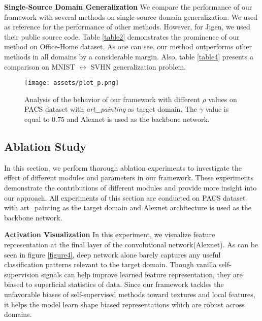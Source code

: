 \documentclass[10pt,twocolumn,letterpaper]{article}
\begin{document}
\vspace{2mm}
\noindent
\textbf{Single-Source Domain Generalization}\quad
We compare the performance of our framework with several methods on single-source domain generalization. We used \cite{roy2019unsupervised} as reference for the performance of other methods. However, for Jigen\cite{carlucci2019domain}, we used their public source code. Table \ref{table2} demonstrates the prominence of our method on Office-Home\cite{venkateswara2017deep} dataset. As one can see, our method outperforms other methods in all domains by a considerable margin. Also, table \ref{table4} presents a comparison on MNIST $\leftrightarrow$ SVHN generalization problem.

\begin{figure}[t!]
	\begin{center}
		\texttt{[image: assets/plot\_p.png]}
	\end{center}
	\caption{Analysis of the behavior of our framework with different $\rho$ values on PACS dataset \cite{li2017deeper} with \textit{art\_painting} as target domain. The $\gamma$ value is equal to $0.75$ and Alexnet is used as the backbone network.}
	\label{figure5}
\end{figure}

\subsection{Ablation Study}


In this section, we perform thorough ablation experiments to investigate the effect of different modules and parameters in our framework. These experiments demonstrate the contributions of different modules and provide more insight into our approach.
All experiments of this section are conducted on PACS dataset \cite{li2017deeper} with art\_painting as the target domain and Alexnet architecture is used as the backbone network.

\vspace{2mm}
\noindent
\textbf{Activation Visualization}\quad 
In this experiment, we visualize feature representation at the final layer of the convolutional network(Alexnet). As can be seen in figure \ref{figure4}, deep network alone barely captures any useful classification patterns relevant to the target domain. Though vanilla self-supervision signals can help improve learned feature representation, they are biased to superficial statistics of data. Since our framework tackles the unfavorable biases of self-supervised methods toward textures and local features, it helps the model learn shape biased representations which are robust across domains.
\end{document}
